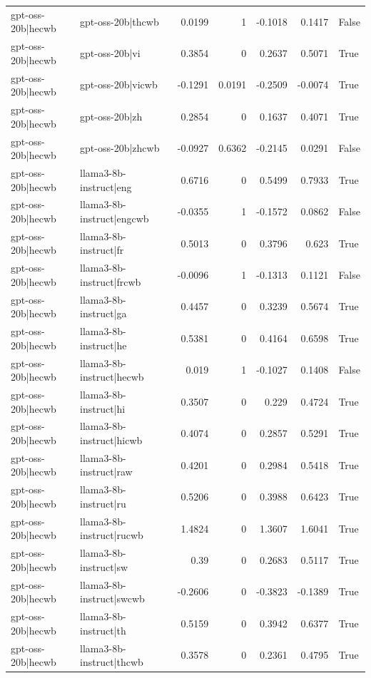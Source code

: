 \begin{table}
\begin{tabular}{l l r r r r l}
gpt-oss-20b|hecwb & gpt-oss-20b|thcwb & 0.0199 & 1 & -0.1018 & 0.1417 & False \\
gpt-oss-20b|hecwb & gpt-oss-20b|vi & 0.3854 & 0 & 0.2637 & 0.5071 & True \\
gpt-oss-20b|hecwb & gpt-oss-20b|vicwb & -0.1291 & 0.0191 & -0.2509 & -0.0074 & True \\
gpt-oss-20b|hecwb & gpt-oss-20b|zh & 0.2854 & 0 & 0.1637 & 0.4071 & True \\
gpt-oss-20b|hecwb & gpt-oss-20b|zhcwb & -0.0927 & 0.6362 & -0.2145 & 0.0291 & False \\
gpt-oss-20b|hecwb & llama3-8b-instruct|eng & 0.6716 & 0 & 0.5499 & 0.7933 & True \\
gpt-oss-20b|hecwb & llama3-8b-instruct|engcwb & -0.0355 & 1 & -0.1572 & 0.0862 & False \\
gpt-oss-20b|hecwb & llama3-8b-instruct|fr & 0.5013 & 0 & 0.3796 & 0.623 & True \\
gpt-oss-20b|hecwb & llama3-8b-instruct|frcwb & -0.0096 & 1 & -0.1313 & 0.1121 & False \\
gpt-oss-20b|hecwb & llama3-8b-instruct|ga & 0.4457 & 0 & 0.3239 & 0.5674 & True \\
gpt-oss-20b|hecwb & llama3-8b-instruct|he & 0.5381 & 0 & 0.4164 & 0.6598 & True \\
gpt-oss-20b|hecwb & llama3-8b-instruct|hecwb & 0.019 & 1 & -0.1027 & 0.1408 & False \\
gpt-oss-20b|hecwb & llama3-8b-instruct|hi & 0.3507 & 0 & 0.229 & 0.4724 & True \\
gpt-oss-20b|hecwb & llama3-8b-instruct|hicwb & 0.4074 & 0 & 0.2857 & 0.5291 & True \\
gpt-oss-20b|hecwb & llama3-8b-instruct|raw & 0.4201 & 0 & 0.2984 & 0.5418 & True \\
gpt-oss-20b|hecwb & llama3-8b-instruct|ru & 0.5206 & 0 & 0.3988 & 0.6423 & True \\
gpt-oss-20b|hecwb & llama3-8b-instruct|rucwb & 1.4824 & 0 & 1.3607 & 1.6041 & True \\
gpt-oss-20b|hecwb & llama3-8b-instruct|sw & 0.39 & 0 & 0.2683 & 0.5117 & True \\
gpt-oss-20b|hecwb & llama3-8b-instruct|swcwb & -0.2606 & 0 & -0.3823 & -0.1389 & True \\
gpt-oss-20b|hecwb & llama3-8b-instruct|th & 0.5159 & 0 & 0.3942 & 0.6377 & True \\
gpt-oss-20b|hecwb & llama3-8b-instruct|thcwb & 0.3578 & 0 & 0.2361 & 0.4795 & True \\

\end{tabular}
\end{table}
